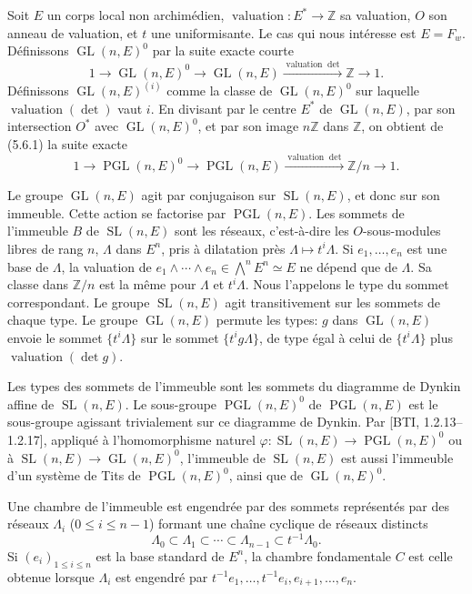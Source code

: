 \documentclass[10pt]{article}
\newcommand{\Z}{\mathbb Z}
\newcommand{\GL}{\operatorname{GL}}
\newcommand{\SL}{\operatorname{SL}}
\newcommand{\val}{\operatorname{valuation}}
\newcommand{\PGL}{\operatorname{PGL}}
\theoremstyle{deligne}
\newcommand{\heading}[1]{\vspace{0.7em}\noindent{\bfseries #1}\quad}
\begin{document}
\heading{5.6.} Soit $E$ un corps local non archimédien, $\val:E^*\to\Z$ sa valuation, $O$ son anneau de valuation, et $t$ une uniformisante. Le cas qui nous intéresse est $E=F_w$. Définissons $\GL(n,E)^0$ par la suite exacte courte
\begin{equation}\tag{5.6.1}
1\to\GL(n,E)^0\to\GL(n,E)\xrightarrow{\val\det}\Z\to1.
\end{equation}
Définissons $\GL(n,E)^{(i)}$ comme la classe de $\GL(n,E)^0$ sur laquelle $\val(\det)$ vaut $i$. En divisant par le centre $E^*$ de $\GL(n,E)$, par son intersection $O^*$ avec $\GL(n,E)^0$, et par son image $n\Z$ dans $\Z$, on obtient de (5.6.1) la suite exacte
\begin{equation}\tag{5.6.2}
1\to\PGL(n,E)^0\to\PGL(n,E)\xrightarrow{\val\det}\Z/n\to1.
\end{equation}

Le groupe $\GL(n,E)$ agit par conjugaison sur $\SL(n,E)$, et donc sur son immeuble. Cette action se factorise par $\PGL(n,E)$. Les sommets de l'immeuble $B$ de $\SL(n,E)$ sont les réseaux, c'est-à-dire les $O$-sous-modules libres de rang $n$, $\Lambda$ dans $E^n$, pris à dilatation près $\Lambda\mapsto t^i\Lambda$. Si $e_1,\ldots,e_n$ est une base de $\Lambda$, la valuation de $e_1\wedge\cdots\wedge e_n\in\bigwedge^nE^n\simeq E$ ne dépend que de $\Lambda$. Sa classe dans $\Z/n$ est la même pour $\Lambda$ et $t^i\Lambda$. Nous l'appelons le type du sommet correspondant. Le groupe $\SL(n,E)$ agit transitivement sur les sommets de chaque type. Le groupe $\GL(n,E)$ permute les types: $g$ dans $\GL(n,E)$ envoie le sommet $\{t^i\Lambda\}$ sur le sommet $\{t^ig\Lambda\}$, de type égal à celui de $\{t^i\Lambda\}$ plus $\val(\det g)$.

Les types des sommets de l'immeuble sont les sommets du diagramme de Dynkin affine de $\SL(n,E)$. Le sous-groupe $\PGL(n,E)^0$ de $\PGL(n,E)$ est le sous-groupe agissant trivialement sur ce diagramme de Dynkin. Par [BTI, 1.2.13--1.2.17], appliqué à l'homomorphisme naturel $\varphi:\SL(n,E)\to\PGL(n,E)^0$ ou à $\SL(n,E)\to\GL(n,E)^0$, l'immeuble de $\SL(n,E)$ est aussi l'immeuble d'un système de Tits de $\PGL(n,E)^0$, ainsi que de $\GL(n,E)^0$.

Une chambre de l'immeuble est engendrée par des sommets représentés par des réseaux $\Lambda_i$ ($0\le i\le n-1$) formant une chaîne cyclique de réseaux distincts
\[
\Lambda_0\subset\Lambda_1\subset\cdots\subset\Lambda_{n-1}\subset t^{-1}\Lambda_0.
\]
Si $(e_i)_{1\le i\le n}$ est la base standard de $E^n$, la chambre fondamentale $C$ est celle obtenue lorsque $\Lambda_i$ est engendré par $t^{-1}e_1,\ldots,t^{-1}e_i,e_{i+1},\ldots,e_n$.
\end{document}
